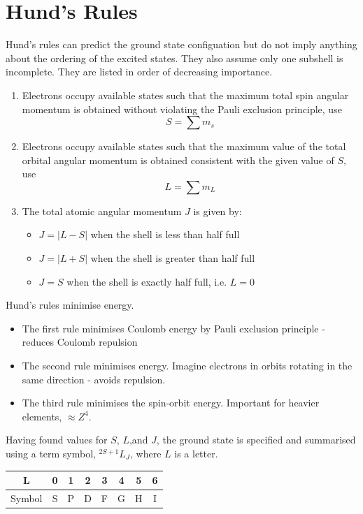\documentclass[a4paper, 11pt, normalem]{report}
\begin{document}
\section{Hund's Rules}
Hund's rules can predict the ground state configuation but do not imply anything about the ordering of the excited states. 
They also assume only one subshell is incomplete. 
They are listed in order of decreasing importance. 
\begin{enumerate}
    \item Electrons occupy available states such that the maximum total spin angular momentum is obtained without violating the Pauli exclusion principle, use
        \begin{equation}
            S = \sum m_s
        \end{equation}
    \item Electrons occupy available states such that the maximum value of the total orbital angular momentum is obtained consistent with the given value of $S$, use
        \begin{equation}
            L = \sum m_L
        \end{equation}
    \item The total atomic angular momentum $J$ is given by:
        \begin{itemize}
            \item $J = |L-S|$ when the shell is less than half full
            \item $J = |L+S|$ when the shell is greater than half full
            \item $J=S$ when the shell is exactly half full, i.e. $L=0$
        \end{itemize}
\end{enumerate}
Hund's rules minimise energy. 
\begin{itemize}
    \item The first rule minimises Coulomb energy by Pauli exclusion principle - reduces Coulomb repulsion
    \item The second rule minimises energy.
        Imagine electrons in orbits rotating in the same direction - avoids repulsion.
    \item The third rule minimises the spin-orbit energy.
        Important for heavier elements, $\approx Z^4$.
\end{itemize}
Having found values for $S$, $L$,and $J$, the ground state is specified and summarised using a term symbol, $^{2S+1}L_J$, where $L$ is a letter. 
\begin{table}[H]
    \centering
    \begin{tabular}{c|ccccccc}
        L & 0 & 1 & 2 & 3 & 4 & 5 & 6 \\
        \hline
        Symbol & S & P & D & F & G & H & I
    \end{tabular}
\end{table}
\end{document}
